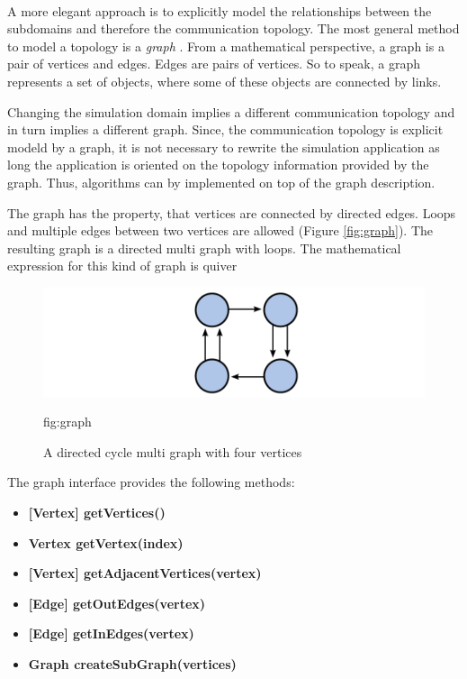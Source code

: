 \paragraph*{}
A more elegant approach is to explicitly model the relationships
between the subdomains and therefore the communication topology. The
most general method to model a topology is a \textit{graph}
\cite{ref:graph}.  From a mathematical perspective, a graph is a pair
of vertices and edges. Edges are pairs of vertices. So to speak, a
graph represents a set of objects, where some of these objects are
connected by links.

Changing the simulation domain implies a different communication
topology and in turn implies a different graph.  Since, the
communication topology is explicit modeld by a graph, it is not
necessary to rewrite the simulation application as long the
application is oriented on the topology information provided by the
graph. Thus, algorithms can by implemented on top of the graph
description.

The graph has the property, that vertices are connected by directed edges. Loops
and multiple edges between two vertices are allowed (Figure
\ref{fig:graph}). The resulting graph is a directed multi graph with
loops. The mathematical expression for this kind of graph is quiver
\cite{ref:quiver}

\begin{figure}[H]
  \centering \includegraphics[width=\textwidth]{graphics/30_graph}
  \caption{ A directed cycle multi graph with four vertices}
    {fig:graph}
\end{figure}

The graph interface provides the following methods:

\begin{itemize}
  \item [] \textbf{[Vertex] getVertices()}
  \item [] \textbf{Vertex getVertex(index)}
  \item [] \textbf{[Vertex] getAdjacentVertices(vertex)}
  \item [] \textbf{[Edge] getOutEdges(vertex)}
  \item [] \textbf{[Edge] getInEdges(vertex)}
  \item [] \textbf{Graph createSubGraph(vertices)}
\end{itemize}

